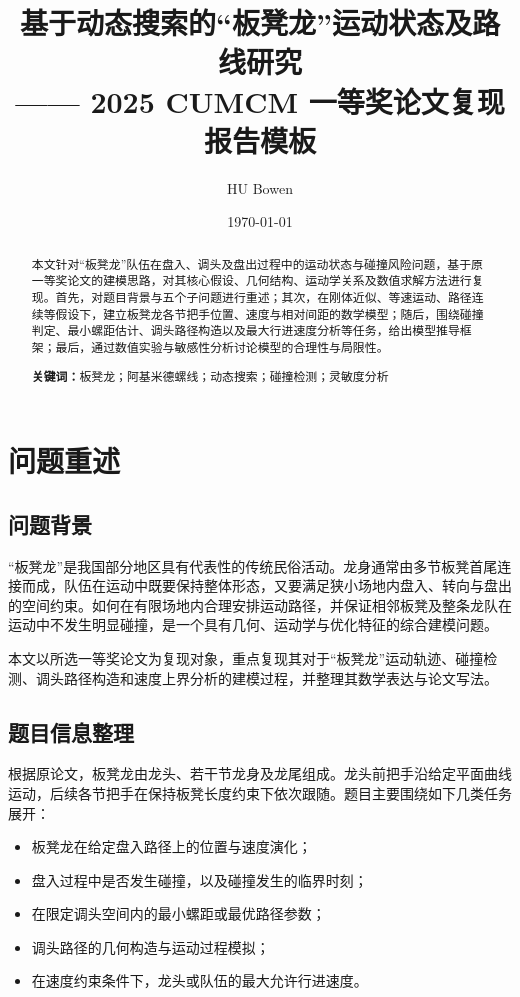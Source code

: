 \documentclass[12pt,a4paper]{ctexart}
\title{\heiti 基于动态搜索的“板凳龙”运动状态及路线研究\\[0.5em]
\large —— 2025 CUMCM 一等奖论文复现报告模板}
\author{HU Bowen}
\date{\today}
\begin{document}
\maketitle

\begin{abstract}
本文针对“板凳龙”队伍在盘入、调头及盘出过程中的运动状态与碰撞风险问题，基于原一等奖论文的建模思路，对其核心假设、几何结构、运动学关系及数值求解方法进行复现。首先，对题目背景与五个子问题进行重述；其次，在刚体近似、等速运动、路径连续等假设下，建立板凳龙各节把手位置、速度与相对间距的数学模型；随后，围绕碰撞判定、最小螺距估计、调头路径构造以及最大行进速度分析等任务，给出模型推导框架；最后，通过数值实验与敏感性分析讨论模型的合理性与局限性。

\textbf{关键词：}板凳龙；阿基米德螺线；动态搜索；碰撞检测；灵敏度分析
\end{abstract}

\tableofcontents
\newpage

\section{问题重述}

\subsection{问题背景}
“板凳龙”是我国部分地区具有代表性的传统民俗活动。龙身通常由多节板凳首尾连接而成，队伍在运动中既要保持整体形态，又要满足狭小场地内盘入、转向与盘出的空间约束。如何在有限场地内合理安排运动路径，并保证相邻板凳及整条龙队在运动中不发生明显碰撞，是一个具有几何、运动学与优化特征的综合建模问题。

本文以所选一等奖论文为复现对象，重点复现其对于“板凳龙”运动轨迹、碰撞检测、调头路径构造和速度上界分析的建模过程，并整理其数学表达与论文写法。

\subsection{题目信息整理}
根据原论文，板凳龙由龙头、若干节龙身及龙尾组成。龙头前把手沿给定平面曲线运动，后续各节把手在保持板凳长度约束下依次跟随。题目主要围绕如下几类任务展开：
\begin{itemize}[leftmargin=2em]
    \item 板凳龙在给定盘入路径上的位置与速度演化；
    \item 盘入过程中是否发生碰撞，以及碰撞发生的临界时刻；
    \item 在限定调头空间内的最小螺距或最优路径参数；
    \item 调头路径的几何构造与运动过程模拟；
    \item 在速度约束条件下，龙头或队伍的最大允许行进速度。
\end{itemize}
\end{document}
